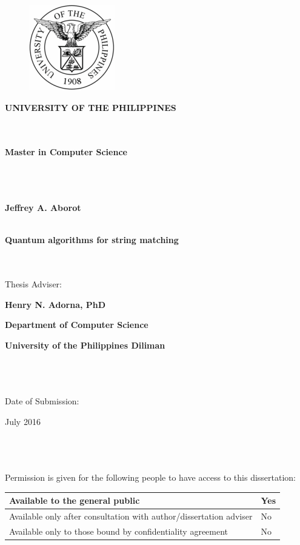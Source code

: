 \section*{}
\begin{figure}
	\centering
	\includegraphics[scale=0.9]{IPR-files/image1.png} 
\end{figure}
\begin{center}
\textbf{UNIVERSITY OF THE PHILIPPINES}

~\\
~\\

\textbf{Master in Computer Science}

~\\
~\\
~\\

\textbf{Jeffrey A. Aborot}

~\\

\textbf{Quantum algorithms for string matching}


~\\
~\\

Thesis Adviser:

\textbf{Henry N. Adorna, PhD}

\textbf{Department of Computer Science}

\textbf{University of the Philippines Diliman}

~\\
~\\
~\\

Date of Submission:

July 2016

~\\
~\\
~\\


Permission is given for the following people to have access to this dissertation:

\begin{table}[h]
\centering
\begin{tabular}
{|l|l|}
\hline Available to the general public			& 	Yes					\\	
\hline Available only after consultation with author/dissertation adviser			& 	No					\\
\hline Available only to those bound by confidentiality agreement		& 	No					\\
\hline
\end{tabular}
\end{table}
~\\


\end{center}
